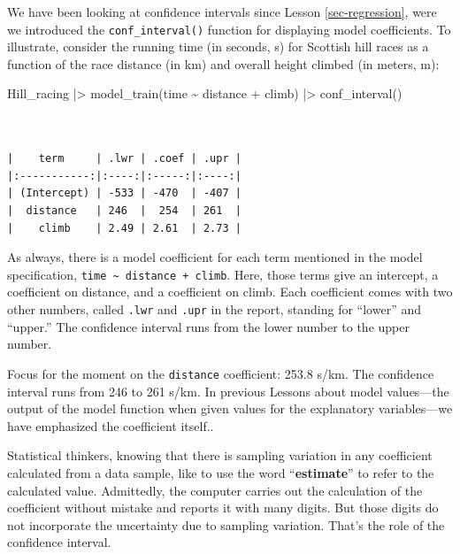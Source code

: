 \documentclass[
  letterpaper,
  DIV=11,
  numbers=noendperiod,
  oneside]{scrartcl}
\newenvironment{Shaded}{\begin{snugshade}}{\end{snugshade}}
\newcommand{\FunctionTok}[1]{\textcolor[rgb]{0.28,0.35,0.67}{#1}}
\newcommand{\NormalTok}[1]{\textcolor[rgb]{0.00,0.23,0.31}{#1}}
\newcommand{\SpecialCharTok}[1]{\textcolor[rgb]{0.37,0.37,0.37}{#1}}
\begin{document}
We have been looking at confidence intervals since Lesson
\ref{sec-regression}, were we introduced the \texttt{conf\_interval()}
function for displaying model coefficients. To illustrate, consider the
running time (in seconds, s) for Scottish hill races as a function of
the race distance (in km) and overall height climbed (in meters, m):

\begin{Shaded}
\begin{Highlighting}[]
\NormalTok{Hill\_racing }\SpecialCharTok{|\textgreater{}} 
  \FunctionTok{model\_train}\NormalTok{(time }\SpecialCharTok{\textasciitilde{}}\NormalTok{ distance }\SpecialCharTok{+}\NormalTok{ climb) }\SpecialCharTok{|\textgreater{}} 
  \FunctionTok{conf\_interval}\NormalTok{()}
\end{Highlighting}
\end{Shaded}

\begin{verbatim}


|    term     | .lwr | .coef | .upr |
|:-----------:|:----:|:-----:|:----:|
| (Intercept) | -533 | -470  | -407 |
|  distance   | 246  |  254  | 261  |
|    climb    | 2.49 | 2.61  | 2.73 |
\end{verbatim}

As always, there is a model coefficient for each term mentioned in the
model specification,
\texttt{time\ \textasciitilde{}\ distance\ +\ climb}. Here, those terms
give an intercept, a coefficient on distance, and a coefficient on
climb. Each coefficient comes with two other numbers, called
\texttt{.lwr} and \texttt{.upr} in the report, standing for ``lower''
and ``upper.'' The confidence interval runs from the lower number to the
upper number.

Focus for the moment on the \texttt{distance} coefficient: 253.8 s/km.
The confidence interval runs from 246 to 261 s/km. In previous Lessons
about model values---the output of the model function when given values
for the explanatory variables---we have emphasized the coefficient
itself..

Statistical thinkers, knowing that there is sampling variation in any
coefficient calculated from a data sample, like to use the word
``\textbf{estimate}'' to refer to the calculated value. Admittedly, the
computer carries out the calculation of the coefficient without mistake
and reports it with many digits. But those digits do not incorporate the
uncertainty due to sampling variation. That's the role of the confidence
interval.
\end{document}
